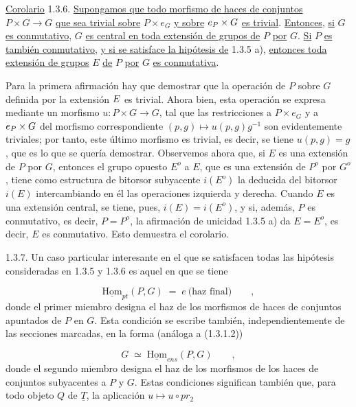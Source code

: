 \par\medskip\noindent
\underline{Corolario} 1.3.6. \underline{Supongamos que todo
morfismo de haces de conjuntos} $P\times G \longrightarrow G$
\underline{que sea trivial sobre} $P\times e_G$ \underline{y sobre}
$\sisi{e_P}{e_P}\times G$ \underline{es trivial}. \underline{Entonces},
\underline{si} $G$ \underline{es conmutativo}, $G$ \underline{es
central en toda extensión de grupos de} $P$ \underline{por} $G$.
\underline{Si} $P$ \underline{es también conmutativo}, \underline{y
si se satisface la hipótesis de} 1.3.5 a), \underline{entonces toda
extensión de grupos} $E$ \underline{de} $P$ \underline{por} $G$
\underline{es conmutativa}.

Para la primera afirmación hay que demostrar que la operación de $P$
sobre $G$ definida por la extensión $\sisi{G}{E}$ es trivial. Ahora
bien, esta operación se expresa mediante un morfismo
$u : P\times G \longrightarrow G$, tal que las restricciones a
$P\times e_G$ y a $\sisi{e_P}{e_P}\times G$ del morfismo
correspondiente $(p,g) \longmapsto u(p,g)g^{-1}$ son evidentemente
triviales; por tanto, este último morfismo es trivial, es decir, se
tiene $u(p,g) = g$, que es lo que se quería demostrar. Observemos ahora
que, si $E$ es una extensión de $P$ por $G$, entonces el grupo opuesto
$E^o$ a $E$, que es una extensión de $P^o$ por $G^o$, tiene como
estructura de bitorsor subyacente $i(E^o)$ la deducida del bitorsor
$i(E)$ intercambiando en él las operaciones izquierda y derecha. Cuando
$E$ es una extensión central, se tiene, pues, $i(E)=i(E^o)$, y si,
además, $P$ es conmutativo, es decir, $P=P^o$, la afirmación de unicidad
1.3.5 a) da $E=E^o$, es decir, $E$ es conmutativo. Esto demuestra el
corolario.



1.3.7. Un caso particular interesante en el que se satisfacen todas
las hipótesis consideradas en 1.3.5 y 1.3.6 es aquel en que se tiene

\begin{equation}\tag{1.3.7.1}
\underline{\mathrm{Hom}}_{pt}(P,G) \;=\; e \ \text{(haz final)} \qquad ,
\end{equation}
donde el primer miembro designa el haz de los morfismos de haces de
conjuntos apuntados de $P$ en $G$. Esta condición se escribe también,
independientemente de las secciones marcadas, en la forma (análoga a
(1.3.1.2))

\begin{equation}\tag{1.3.7.2}
G \;\simeq\; \underline{\mathrm{Hom}}_{ens}(P,G) \qquad ,
\end{equation}
donde el segundo miembro designa el haz de los morfismos de los haces
de conjuntos subyacentes a $P$ y $G$. Estas condiciones significan
también que, para todo objeto $Q$ de $\underline{T}$, la aplicación
$u \longmapsto u\circ pr_2$

